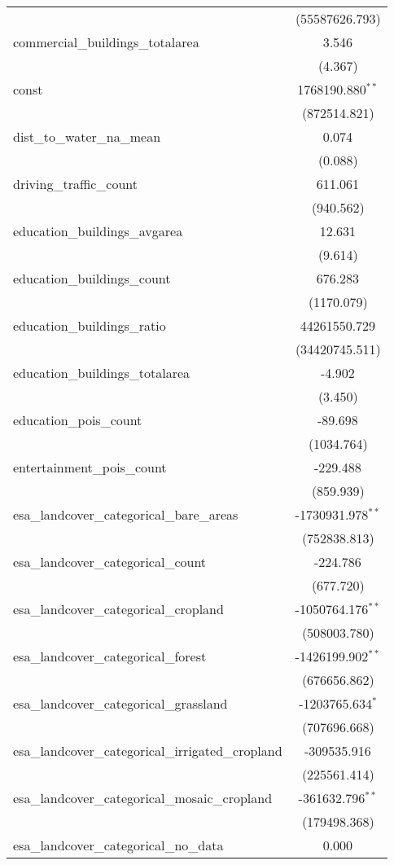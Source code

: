\begin{table}[!htbp]
\begin{tabular}{@{\extracolsep{5pt}}lc}
  & (55587626.793) \\
 commercial_buildings_totalarea & 3.546$^{}$ \\
  & (4.367) \\
 const & 1768190.880$^{**}$ \\
  & (872514.821) \\
 dist_to_water_na_mean & 0.074$^{}$ \\
  & (0.088) \\
 driving_traffic_count & 611.061$^{}$ \\
  & (940.562) \\
 education_buildings_avgarea & 12.631$^{}$ \\
  & (9.614) \\
 education_buildings_count & 676.283$^{}$ \\
  & (1170.079) \\
 education_buildings_ratio & 44261550.729$^{}$ \\
  & (34420745.511) \\
 education_buildings_totalarea & -4.902$^{}$ \\
  & (3.450) \\
 education_pois_count & -89.698$^{}$ \\
  & (1034.764) \\
 entertainment_pois_count & -229.488$^{}$ \\
  & (859.939) \\
 esa_landcover_categorical_bare_areas & -1730931.978$^{**}$ \\
  & (752838.813) \\
 esa_landcover_categorical_count & -224.786$^{}$ \\
  & (677.720) \\
 esa_landcover_categorical_cropland & -1050764.176$^{**}$ \\
  & (508003.780) \\
 esa_landcover_categorical_forest & -1426199.902$^{**}$ \\
  & (676656.862) \\
 esa_landcover_categorical_grassland & -1203765.634$^{*}$ \\
  & (707696.668) \\
 esa_landcover_categorical_irrigated_cropland & -309535.916$^{}$ \\
  & (225561.414) \\
 esa_landcover_categorical_mosaic_cropland & -361632.796$^{**}$ \\
  & (179498.368) \\
 esa_landcover_categorical_no_data & 0.000$^{}$ \\

\end{tabular}
\end{table}
